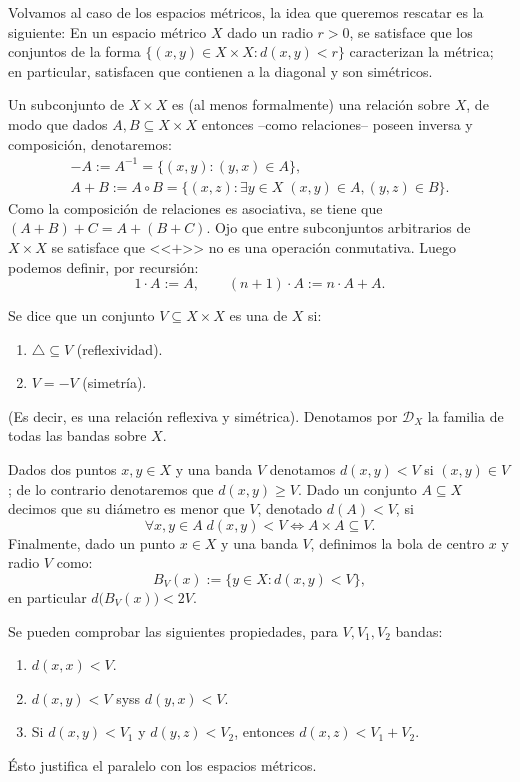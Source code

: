 \documentclass[topologia-analisis.tex]{subfiles}
\begin{document}
Volvamos al caso de los espacios métricos, la idea que queremos rescatar es la siguiente:
En un espacio métrico $X$ dado un radio $r > 0$, se satisface que los conjuntos de la forma $\{ (x, y) \in X\times X : d(x, y) < r \}$ caracterizan la métrica;
en particular, satisfacen que contienen a la diagonal y son simétricos.

Un subconjunto de $X \times X$ es (al menos formalmente) una relación sobre $X$, de modo que dados $A, B \subseteq X \times X$ entonces --como relaciones--
poseen inversa y composición, denotaremos:
\begin{gather*}
	-A := A^{-1} = \{ (x, y) : (y, x) \in A \}, \\
	A + B := A\circ B = \{ (x, z) : \exists y\in X \; (x, y) \in A, (y, z) \in B \}.
\end{gather*}
Como la composición de relaciones es asociativa, se tiene que $(A + B) + C = A + (B + C)$.
Ojo que entre subconjuntos arbitrarios de $X\times X$ se satisface que <<$+$>> no es una operación conmutativa.
Luego podemos definir, por recursión:
$$ 1\cdot A := A, \qquad (n+1)\cdot A := n\cdot A + A. $$
\begin{mydef}
	Se dice que un conjunto $V \subseteq X\times X$ es una  de $X$ si:
	\begin{enumerate}[{B}1.]
		\item $\triangle \subseteq V$ (reflexividad).
		\item $V = -V$ (simetría).
	\end{enumerate}
	(Es decir, es una relación reflexiva y simétrica).
	Denotamos por $\mathcal{D}_X$ la familia de todas las bandas sobre $X$.

	Dados dos puntos $x, y \in X$ y una banda $V$ denotamos $d(x, y) < V$ si $(x, y) \in V$; de lo contrario denotaremos que $d(x, y) \ge V$.
	Dado un conjunto $A \subseteq X$ decimos que su diámetro es menor que $V$, denotado $d(A) < V$, si
	$$ \forall x,y \in A \; d(x, y) < V \iff A\times A \subseteq V. $$
	Finalmente, dado un punto $x \in X$ y una banda $V$, definimos la bola de centro $x$ y radio $V$ como:
	$$ B_V(x) := \{ y \in X : d(x, y) < V \}, $$
	en particular $d\big( B_V(x) \big) < 2V$.
\end{mydef}
Se pueden comprobar las siguientes propiedades, para $V, V_1, V_2$ bandas:
\begin{enumerate}
	\item $d(x, x) < V$.
	\item $d(x, y) < V$ syss $d(y, x) < V$.
	\item Si $d(x, y) < V_1$ y $d(y, z) < V_2$, entonces $d(x, z) < V_1 + V_2$.
\end{enumerate}
Ésto justifica el paralelo con los espacios métricos.
\end{document}
